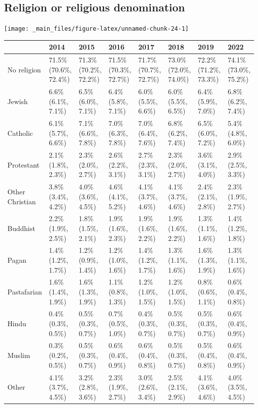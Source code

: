\documentclass[
]{book}
\begin{document}
\hypertarget{religion-or-religious-denomination}{%
\subsection{Religion or religious denomination}\label{religion-or-religious-denomination}}

\texttt{[image: \_main\_files/figure-latex/unnamed-chunk-24-1]}

\begin{table}
\centering
\begin{tabular}[t]{>{}l|>{}l|>{}l|>{}l|>{}l|>{}l|>{}l|>{}l}
\hline
  & 2014 & 2015 & 2016 & 2017 & 2018 & 2019 & 2022\\
\hline
No religion & 71.5\% (70.6\%, 72.4\%) & 71.3\% (70.2\%, 72.2\%) & 71.5\% (70.3\%, 72.7\%) & 71.7\% (70.7\%, 72.7\%) & 73.0\% (72.0\%, 74.0\%) & 72.2\% (71.2\%, 73.3\%) & 74.1\% (73.0\%, 75.2\%)\\
\hline
Jewish & 6.6\% (6.1\%, 7.1\%) & 6.5\% (6.0\%, 7.1\%) & 6.4\% (5.8\%, 7.1\%) & 6.0\% (5.5\%, 6.6\%) & 6.0\% (5.5\%, 6.5\%) & 6.4\% (5.9\%, 7.0\%) & 6.8\% (6.2\%, 7.4\%)\\
\hline
Catholic & 6.1\% (5.7\%, 6.6\%) & 7.1\% (6.6\%, 7.8\%) & 7.0\% (6.3\%, 7.8\%) & 7.0\% (6.4\%, 7.6\%) & 6.8\% (6.2\%, 7.4\%) & 6.5\% (6.0\%, 7.2\%) & 5.4\% (4.8\%, 6.0\%)\\
\hline
Protestant & 2.1\% (1.8\%, 2.3\%) & 2.3\% (2.0\%, 2.7\%) & 2.6\% (2.2\%, 3.1\%) & 2.7\% (2.3\%, 3.1\%) & 2.3\% (2.0\%, 2.7\%) & 3.6\% (3.1\%, 4.0\%) & 2.9\% (2.5\%, 3.3\%)\\
\hline
Other Christian & 3.8\% (3.4\%, 4.2\%) & 4.0\% (3.6\%, 4.5\%) & 4.6\% (4.1\%, 5.2\%) & 4.1\% (3.7\%, 4.6\%) & 4.1\% (3.7\%, 4.6\%) & 2.4\% (2.1\%, 2.8\%) & 2.3\% (1.9\%, 2.7\%)\\
\hline
Buddhist & 2.2\% (1.9\%, 2.5\%) & 1.8\% (1.5\%, 2.1\%) & 1.9\% (1.6\%, 2.3\%) & 1.9\% (1.6\%, 2.2\%) & 1.9\% (1.6\%, 2.2\%) & 1.3\% (1.1\%, 1.6\%) & 1.4\% (1.2\%, 1.8\%)\\
\hline
Pagan & 1.4\% (1.2\%, 1.7\%) & 1.2\% (0.9\%, 1.4\%) & 1.2\% (1.0\%, 1.6\%) & 1.4\% (1.2\%, 1.7\%) & 1.3\% (1.1\%, 1.6\%) & 1.6\% (1.3\%, 1.9\%) & 1.3\% (1.1\%, 1.6\%)\\
\hline
Pastafarian & 1.6\% (1.4\%, 1.9\%) & 1.6\% (1.3\%, 1.9\%) & 1.1\% (0.8\%, 1.3\%) & 1.2\% (1.0\%, 1.5\%) & 1.2\% (1.0\%, 1.5\%) & 0.8\% (0.6\%, 1.1\%) & 0.6\% (0.4\%, 0.8\%)\\
\hline
Hindu & 0.4\% (0.3\%, 0.5\%) & 0.5\% (0.3\%, 0.7\%) & 0.7\% (0.5\%, 1.0\%) & 0.4\% (0.3\%, 0.7\%) & 0.5\% (0.3\%, 0.7\%) & 0.5\% (0.3\%, 0.7\%) & 0.6\% (0.4\%, 0.9\%)\\
\hline
Muslim & 0.3\% (0.2\%, 0.5\%) & 0.5\% (0.3\%, 0.7\%) & 0.6\% (0.4\%, 0.9\%) & 0.6\% (0.4\%, 0.8\%) & 0.5\% (0.3\%, 0.7\%) & 0.5\% (0.4\%, 0.8\%) & 0.6\% (0.4\%, 0.9\%)\\
\hline
Other & 4.1\% (3.7\%, 4.5\%) & 3.2\% (2.8\%, 3.6\%) & 2.3\% (1.9\%, 2.7\%) & 3.0\% (2.6\%, 3.4\%) & 2.5\% (2.1\%, 2.9\%) & 4.1\% (3.6\%, 4.6\%) & 4.0\% (3.5\%, 4.5\%)\\
\hline
\end{tabular}
\end{table}
\end{document}
